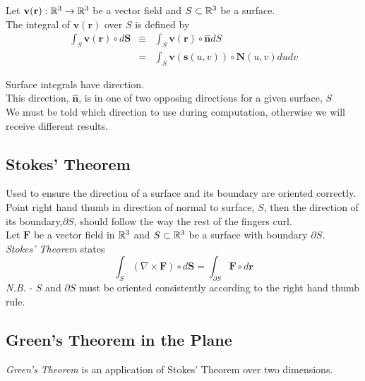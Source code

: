 \documentclass[11pt,a4paper]{article}
\begin{document}
Let $\textbf{v}(\textbf{r}):\mathbb{R}^3\to\mathbb{R}^3$ be a vector field and $S\subset\mathbb{R}^3$ be a surface.\\
The integral of $\textbf{v}(\textbf{r})$ over $S$ is defined by
\[\begin{array}{rcl}
\displaystyle{\int_S\textbf{v}(\textbf{r})\circ d\textbf{S}}&\equiv&\displaystyle{\int_S\textbf{v}(\textbf{r})\circ\hat{\textbf{n}}dS}\\
&=&\displaystyle{\int_S\textbf{v}(\textbf{s}(u,v))\circ\textbf{N}(u,v)dudv}
\end{array}\]

Surface integrals have direction.\\
This direction, $\hat{\textbf{n}}$, is in one of two opposing directions for a given surface, $S$\\
We must be told which direction to use during computation, otherwise we will receive different results.

\subsection{Stokes' Theorem}

Used to ensure the direction of a surface and its boundary are oriented correctly.\\
Point right hand thumb in direction of normal to surface, $S$, then the direction of its boundary,$\partial S$, should follow the way the rest of the fingers curl.\\

Let $\textbf{F}$ be a vector field in $\mathbb{R}^3$ and $S\subset\mathbb{R}^3$ be a surface with boundary $\partial S$.\\
\textit{Stokes' Theorem} states
$$\int_S(\nabla\times\textbf{F})\circ d\textbf{S}=\int_{\partial S}\textbf{F}\circ d\textbf{r}$$
\textit{N.B.} - $S$ and $\partial S$ must be oriented consistently according to the right hand thumb rule.

\subsection{Green's Theorem in the Plane}

\textit{Green's Theorem} is an application of Stokes' Theorem over two dimensions.\\
\end{document}
